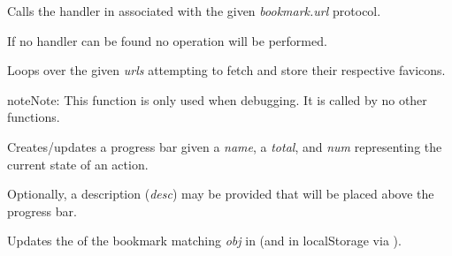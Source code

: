 \documentclass[letterpaper,10pt,openany]{sphinxmanual}
\begin{document}

\begin{fulllineitems}
\label{Applications/terminal/plugin_bookmarks:GateOne.Bookmarks.updateIcon}
Calls the handler in  associated with the given \emph{bookmark.url} protocol.

If no handler can be found no operation will be performed.

\end{fulllineitems}


\begin{fulllineitems}
\label{Applications/terminal/plugin_bookmarks:GateOne.Bookmarks.updateIcons}
Loops over the given \emph{urls} attempting to fetch and store their respective favicons.

\begin{notice}{note}{Note:}
This function is only used when debugging.  It is called by no other functions.
\end{notice}

\end{fulllineitems}


\begin{fulllineitems}
\label{Applications/terminal/plugin_bookmarks:GateOne.Bookmarks.updateProgress}
Creates/updates a progress bar given a \emph{name}, a \emph{total}, and \emph{num} representing the current state of an action.

Optionally, a description (\emph{desc}) may be provided that will be placed above the progress bar.

\end{fulllineitems}


\begin{fulllineitems}
\label{Applications/terminal/plugin_bookmarks:GateOne.Bookmarks.updateUSN}
Updates the  of the bookmark matching \emph{obj} in  (and in localStorage via {\hyperref[Applications/terminal/plugin_bookmarks:GateOne.Bookmarks.storeBookmark]{}}).

\end{fulllineitems}
\end{document}
